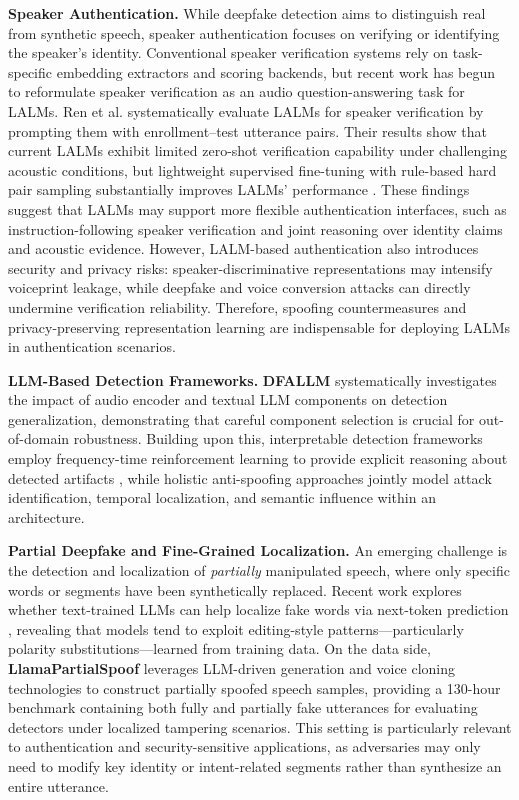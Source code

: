 \documentclass{llmxive}
\begin{document}
\textbf{Speaker Authentication.}
While deepfake detection aims to distinguish real from synthetic speech, speaker authentication focuses on verifying or identifying the speaker's identity. Conventional speaker verification systems rely on task-specific embedding extractors and scoring backends, but recent work has begun to reformulate speaker verification as an audio question-answering task for LALMs. Ren et al. \cite{ren2025audiolargelanguagemodels} systematically evaluate LALMs for speaker verification by prompting them with enrollment--test utterance pairs. Their results show that current LALMs exhibit limited zero-shot verification capability under challenging acoustic conditions, but lightweight supervised fine-tuning with rule-based hard pair sampling substantially improves LALMs' performance \cite{ren2025audiolargelanguagemodels}. These findings suggest that LALMs may support more flexible authentication interfaces, such as instruction-following speaker verification and joint reasoning over identity claims and acoustic evidence. However, LALM-based authentication also introduces security and privacy risks: speaker-discriminative representations may intensify voiceprint leakage, while deepfake and voice conversion attacks can directly undermine verification reliability. Therefore, spoofing countermeasures and privacy-preserving representation learning are indispensable for deploying LALMs in authentication scenarios.

\textbf{LLM-Based Detection Frameworks.} \textbf{DFALLM} \cite{li2025dfallm} systematically investigates the impact of audio encoder and textual LLM components on detection generalization, demonstrating that careful component selection is crucial for out-of-domain robustness. Building upon this, interpretable detection frameworks employ frequency-time reinforcement learning to provide explicit reasoning about detected artifacts \cite {xie2026interpretable}, while holistic anti-spoofing approaches \cite{xu2026holiantispoof} jointly model attack identification, temporal localization, and semantic influence within an architecture.

\textbf{Partial Deepfake and Fine-Grained Localization.} An emerging challenge is the detection and localization of \textit{partially} manipulated speech, where only specific words or segments have been synthetically replaced. Recent work explores whether text-trained LLMs can help localize fake words via next-token prediction \cite{zhang2026can}, revealing that models tend to exploit editing-style patterns---particularly polarity substitutions---learned from training data. On the data side, \textbf{LlamaPartialSpoof} \cite{luong2025llamapartialspoof} leverages LLM-driven generation and voice cloning technologies to construct partially spoofed speech samples, providing a 130-hour benchmark containing both fully and partially fake utterances for evaluating detectors under localized tampering scenarios. This setting is particularly relevant to authentication and security-sensitive applications, as adversaries may only need to modify key identity or intent-related segments rather than synthesize an entire utterance.
 
\end{document}

